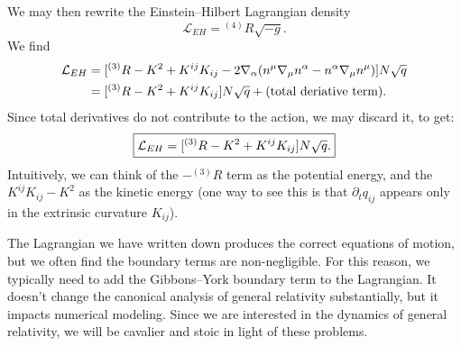 We may then rewrite the Einstein--Hilbert Lagrangian density
\begin{equation}
\mathcal{L}_{EH} = {}^{(4)}R\sqrt{-g}.
\end{equation}
We find
\begin{equation}
  \begin{split}
\mathcal{L}_{EH} &= [{}^{(3)}R - K^{2} + K^{ij}K_{ij}-2\nabla_{\alpha}(n^{\mu}\nabla_{\mu}n^{\alpha}-n^{\alpha}\nabla_{\mu}n^{\mu})]N\sqrt{q}\\
&= [{}^{(3)}R - K^{2} + K^{ij}K_{ij}]N\sqrt{q}+(\mbox{total deriative term}).
\end{split}
\end{equation}
Since total derivatives do not contribute to the action, we may discard
it, to get:
\begin{equation}
\boxed{\mathcal{L}_{EH}= [{}^{(3)}R - K^{2} + K^{ij}K_{ij}]N\sqrt{q}.}
\end{equation}
Intuitively, we can think of the $-{}^{(3)}R$ term as the potential
energy, and the $K^{ij}K_{ij}-K^{2}$ as the kinetic energy (one way to
see this is that $\partial_{t}q_{ij}$ appears only in the extrinsic
curvature $K_{ij}$).

\begin{danger}
The Lagrangian we have written down produces the correct equations of
motion, but we often find the boundary terms are non-negligible. For
this reason, we typically need to add the Gibbons--York boundary term to
the Lagrangian. It doesn't change the canonical analysis of general
relativity substantially, but it impacts numerical modeling. Since we
are interested in the dynamics of general relativity, we will be
cavalier and stoic in light of these problems.
\end{danger}